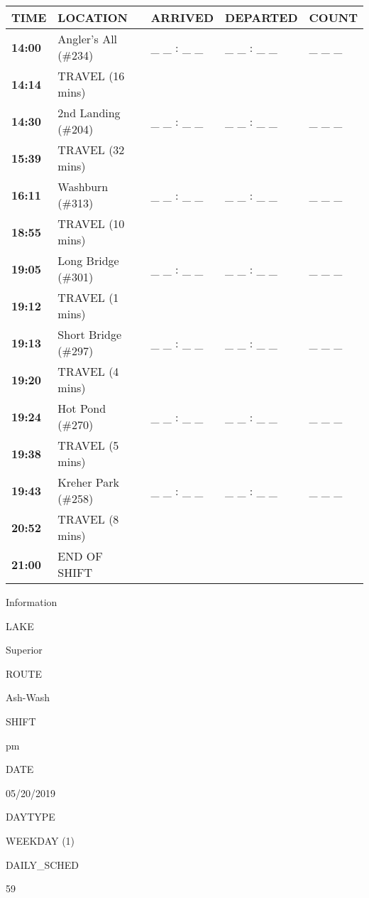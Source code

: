 \documentclass[]{article}
\begin{document}
\begin{tabular}{>{\bfseries}lllll}
\toprule
\textbf{TIME} & \textbf{LOCATION} & \textbf{ARRIVED} & \textbf{DEPARTED} & \textbf{COUNT}\\
\midrule
14:00 & Angler's All (\#234) & \_ \_ : \_ \_ & \_ \_ : \_ \_ & \_ \_ \_\\
14:14 & TRAVEL (16 mins) &  &  & \\
14:30 & 2nd Landing (\#204) & \_ \_ : \_ \_ & \_ \_ : \_ \_ & \_ \_ \_\\
15:39 & TRAVEL (32 mins) &  &  & \\
16:11 & Washburn (\#313) & \_ \_ : \_ \_ & \_ \_ : \_ \_ & \_ \_ \_\\
18:55 & TRAVEL (10 mins) &  &  & \\
19:05 & Long Bridge (\#301) & \_ \_ : \_ \_ & \_ \_ : \_ \_ & \_ \_ \_\\
19:12 & TRAVEL (1 mins) &  &  & \\
19:13 & Short Bridge (\#297) & \_ \_ : \_ \_ & \_ \_ : \_ \_ & \_ \_ \_\\
19:20 & TRAVEL (4 mins) &  &  & \\
19:24 & Hot Pond (\#270) & \_ \_ : \_ \_ & \_ \_ : \_ \_ & \_ \_ \_\\
19:38 & TRAVEL (5 mins) &  &  & \\
19:43 & Kreher Park (\#258) & \_ \_ : \_ \_ & \_ \_ : \_ \_ & \_ \_ \_\\
20:52 & TRAVEL (8 mins) &  &  & \\
21:00 & END OF SHIFT &  &  & \\
\bottomrule
\end{tabular}\newpage

Information

LAKE

Superior

ROUTE

Ash-Wash

SHIFT

pm

DATE

05/20/2019

DAYTYPE

WEEKDAY (1)

DAILY\_SCHED

59

\vspace{24pt}
\end{document}
